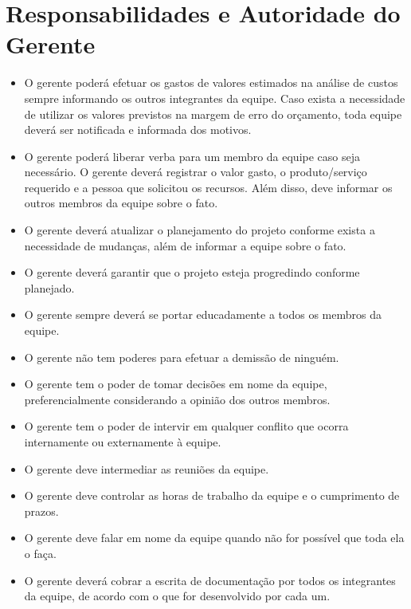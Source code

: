 \chapter{Responsabilidades e Autoridade do Gerente}
\begin{itemize}
  \item O gerente poderá efetuar os gastos de valores estimados na análise de custos sempre informando os outros integrantes da equipe. Caso exista a necessidade de utilizar os valores previstos na margem de erro do orçamento, toda equipe deverá ser notificada e informada dos motivos.
  \item O gerente poderá liberar verba para um membro da equipe caso seja necessário. O gerente deverá registrar o valor gasto, o produto/serviço requerido e a pessoa que solicitou os recursos. Além disso, deve informar os outros membros da equipe sobre o fato.
  \item O gerente deverá atualizar o planejamento do projeto conforme exista a necessidade de mudanças, além de informar a equipe sobre o fato.
  \item O gerente deverá garantir que o projeto esteja progredindo conforme planejado.
  \item O gerente sempre deverá se portar educadamente a todos os membros da equipe.
  \item O gerente não tem poderes para efetuar a demissão de ninguém.
  \item O gerente tem o poder de tomar decisões em nome da equipe, preferencialmente considerando a opinião dos outros membros.
  \item O gerente tem o poder de intervir em qualquer conflito que ocorra internamente ou externamente à equipe.
  \item O gerente deve intermediar as reuniões da equipe.
  \item O gerente deve controlar as horas de trabalho da equipe e o cumprimento de prazos.
  \item O gerente deve falar em nome da equipe quando não for possível que toda ela o faça.
  \item O gerente deverá cobrar a escrita de documentação por todos os integrantes da equipe, de acordo com o que for desenvolvido por cada um.
\end{itemize}
